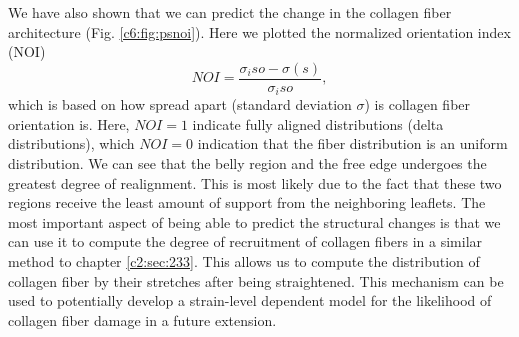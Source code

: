     
    We have also shown that we can predict the change in the collagen fiber architecture (Fig. \ref{c6:fig:psnoi}). Here we plotted the normalized orientation index (NOI)
    \begin{equation}
        NOI = \frac{\sigma_iso - \sigma(s)}{\sigma_iso},
    \end{equation}
    which is based on how spread apart (standard deviation $\sigma$) is collagen fiber orientation is. Here, $NOI = 1$ indicate fully aligned distributions (delta distributions), which $NOI = 0$ indication that the fiber distribution is an uniform distribution. We can see that the belly region and the free edge undergoes the greatest degree of realignment. This is most likely due to the fact that these two regions receive the least amount of support from the neighboring leaflets. The most important aspect of being able to predict the structural changes is that we can use it to compute the degree of recruitment of collagen fibers in a similar method to chapter \ref{c2:sec:233}. This allows us to compute the distribution of collagen fiber by their stretches after being straightened. This mechanism can be used to potentially develop a strain-level dependent model for the likelihood of collagen fiber damage in a future extension. 

    
